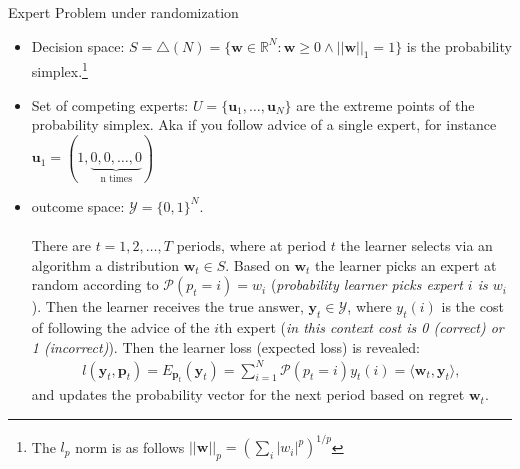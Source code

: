 \documentclass[11pt]{article}
\theoremstyle{quest}
\newcommand{\R}{\mathbb{R}}
\begin{document}
\begin{tcolorbox}
\label{rando}
\begin{center}Expert Problem under randomization\end{center}
\begin{itemize}
	\item Decision space: $S= \triangle(N)= \{\mathbf{w}\in \R^N: \mathbf{w}\ge 0 \land ||\mathbf{w}||_1 =1 \}$ is the probability simplex.\footnote{The $l_p$ norm is as follows $||\mathbf{w}||_p =(\sum_i |w_i|^p)^{1/p}$}
	\item Set of competing experts: $U = \{\mathbf{u}_1,\dots, \mathbf{u}_N\}$ are the extreme points of the probability simplex. Aka if you follow advice of a single expert, for instance $\mathbf{u}_1 = (1,\underbrace{0,0,\dots,0}_{\text{n times}})$
	\item outcome space: $\mathcal{Y}= \{0,1\}^N$.\\ \\ 
	There are $t = 1,2,\dots,T$ periods, where at period $t$ the learner selects via an algorithm a distribution  $\mathbf{w}_t \in S$. Based on $\mathbf{w}_t$ the learner picks an expert at random according to $\mathcal{P}(p_t =i)=w_i$ (\textit{probability learner picks expert $i$ is $w_i$}). Then the learner receives the true answer, $\mathbf{y}_t\in \mathcal{Y}$, where $y_t(i)$  is the cost of following the advice of the $i$th expert (\textit{in this context cost is 0 (correct) or 1 (incorrect)}). Then the learner loss (expected loss) is revealed:
	\begin{align*}
	l(\mathbf{y}_t, \mathbf{p}_t) = E_{ \mathbf{p}_t}(\mathbf{y}_t) = \sum_{i=1}^N \mathcal{P}(p_t =i)y_t(i) = \langle \mathbf{w}_t, \mathbf{y}_t\rangle,
	\end{align*} and updates the probability vector for the next period based on regret $\mathbf{w}_t$. 


\end{itemize}
\end{tcolorbox}
\end{document}
